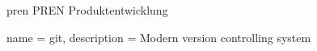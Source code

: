 \newacronym
  {pren}  %
  {PREN}  %
  {Produktentwicklung}  %

{
  name = git,
  description = {
    Modern version controlling system
  }
}